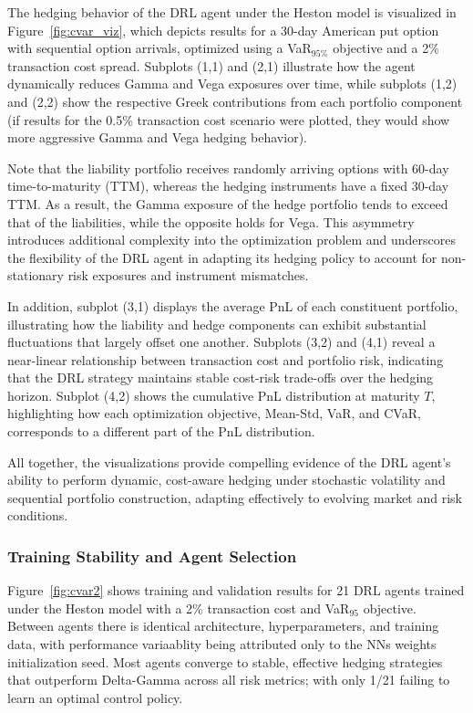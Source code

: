 \documentclass[a4paper,fleqn]{cas-dc}
\begin{document}
The hedging behavior of the DRL agent under the Heston model is visualized in Figure~\ref{fig:cvar_viz}, which depicts results for a 30-day American put option with sequential option arrivals, optimized using a VaR$_{95\%}$ objective and a 2\% transaction cost spread. Subplots (1,1) and (2,1) illustrate how the agent dynamically reduces Gamma and Vega exposures over time, while subplots (1,2) and (2,2) show the respective Greek contributions from each portfolio component (if results for the 0.5\% transaction cost scenario were plotted, they would show more aggressive Gamma and Vega hedging behavior).

Note that the liability portfolio receives randomly arriving options with 60-day time-to-maturity (TTM), whereas the hedging instruments have a fixed 30-day TTM. As a result, the Gamma exposure of the hedge portfolio tends to exceed that of the liabilities, while the opposite holds for Vega. This asymmetry introduces additional complexity into the optimization problem and underscores the flexibility of the DRL agent in adapting its hedging policy to account for non-stationary risk exposures and instrument mismatches.

In addition, subplot (3,1) displays the average PnL of each constituent portfolio, illustrating how the liability and hedge components can exhibit substantial fluctuations that largely offset one another. Subplots (3,2) and (4,1) reveal a near-linear relationship between transaction cost and portfolio risk, indicating that the DRL strategy maintains stable cost-risk trade-offs over the hedging horizon. Subplot (4,2) shows the cumulative PnL distribution at maturity $T$, highlighting how each optimization objective, Mean-Std, VaR, and CVaR, corresponds to a different part of the PnL distribution.

All together, the visualizations provide compelling evidence of the DRL agent’s ability to perform dynamic, cost-aware hedging under stochastic volatility and sequential portfolio construction, adapting effectively to evolving market and risk conditions.

\subsubsection{Training Stability and Agent Selection}
\label{sec:appendix_trainingdynamics}

Figure~\ref{fig:cvar2} shows training and validation results for 21 DRL agents trained under the Heston model with a 2\% transaction cost and VaR$_{95}$ objective. Between agents there is identical architecture, hyperparameters, and training data, with performance variaablity being attributed only to the NNs weights initialization seed. Most agents converge to stable, effective hedging strategies that outperform Delta-Gamma across all risk metrics; with only 1/21 failing to learn an optimal control policy.
\end{document}
